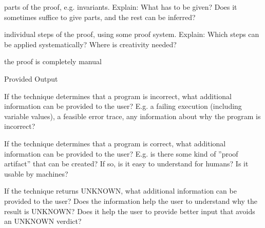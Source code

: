 \documentclass[a4paper]{article}
\begin{document}
\begin{minipage}[t]{0.16\linewidth}
\begin{betterlist}
\begin{betterlist}
			\item \checkboxUnchecked parts of the proof, e.g. invariants. Explain: What has to be given? Does it sometimes suffice to give parts, and the rest can be inferred?
			\item \checkboxUnchecked individual steps of the proof, using some proof system. Explain: Which steps can be applied systematically? Where is creativity needed?
			\item \checkboxUnchecked the proof is completely manual
		\end{betterlist}
		\item \alert{Provided Output}
		\begin{betterlist}
			\item If the technique determines that a program is incorrect, what additional information can be provided to the user? E.g. a failing execution (including variable values), a feasible error trace, any information about why the program is incorrect?

			\item If the technique determines that a program is correct, what additional information can be provided to the user? E.g. is there some kind of ”proof artifact” that can be created? If so, is it easy to understand for humans? Is it usable by machines?

			\item If the technique returns UNKNOWN, what additional information can be provided to the user? Does the information help the user to understand why the result is UNKNOWN? Does it help the user to provide better input that avoids an UNKNOWN verdict?


\end{betterlist}
\end{betterlist}
\end{minipage}
\end{document}
